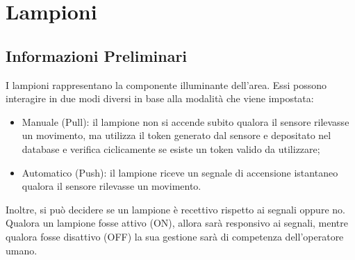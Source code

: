 \documentclass[a4paper, 12pt]{article}
\begin{document}
\newpage
\section{Lampioni}
\subsection{Informazioni Preliminari}
I lampioni rappresentano la componente illuminante dell'area. Essi possono interagire in due modi diversi in base alla modalità che viene impostata:
\begin{itemize}
    \item Manuale (Pull): il lampione non si accende subito qualora il sensore rilevasse un movimento, ma utilizza il token generato dal sensore e depositato nel database e verifica ciclicamente se esiste un token valido da utilizzare;
    \item Automatico (Push): il lampione riceve un segnale di accensione istantaneo qualora il sensore rilevasse un movimento.
\end{itemize}
Inoltre, si può decidere se un lampione è recettivo rispetto ai segnali oppure no. Qualora un lampione fosse attivo (ON), allora sarà responsivo ai segnali, mentre qualora fosse disattivo (OFF) la sua gestione sarà di competenza dell'operatore umano.
\end{document}

